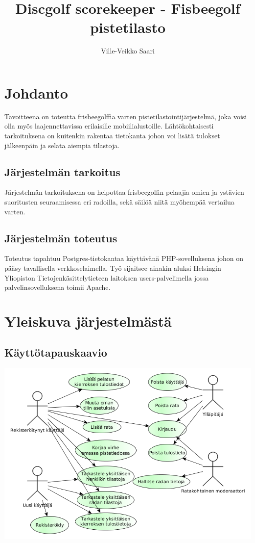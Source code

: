 \documentclass[10pt,a4paper]{article}
\begin{document}
\author{Ville-Veikko Saari}
\title{Discgolf scorekeeper - Fisbeegolf pistetilasto}
\maketitle
\newpage
\tableofcontents
\newpage
\section{Johdanto}
Tavoitteena on toteutta frisbeegolffia varten pistetilastointijärjestelmä, joka voisi olla myös laajennettavissa erilaisille mobiilialustoille. Lähtökohtaisesti tarkoituksena on kuitenkin rakentaa tietokanta johon voi lisätä tulokset jälkeenpäin ja selata aiempia tilastoja.
\subsection{Järjestelmän tarkoitus}
Järjestelmän tarkoituksena on helpottaa frisbeegolfin pelaajia omien ja ystävien suoritusten seuraamisessa eri radoilla, sekä säilöä niitä myöhempää vertailua varten.
\subsection{Järjestelmän toteutus}
Toteutus tapahtuu Postgres-tietokantaa käyttävänä PHP-sovelluksena johon on pääsy tavallisella verkkoselaimella. Työ sijaitsee ainakin aluksi Helsingin Yliopiston Tietojenkäsittelytieteen laitoksen users-palvelimella jossa palvelinsovelluksena toimii Apache.
\newpage
\section{Yleiskuva järjestelmästä}

\subsection{Käyttötapauskaavio}
\includegraphics[scale=0.5]{kayttotapauskaavio}
\end{document}
